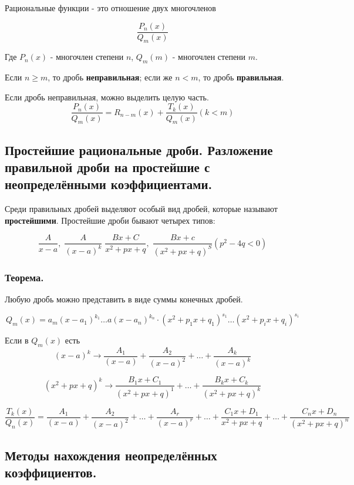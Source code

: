 \documentclass[a4paper,12pt]{article}
\theoremstyle{plain} %
\theoremstyle{definition} %
\theoremstyle{remark} %
\begin{document}
Рациональные функции - это отношение двух многочленов

\[
	\frac{P_n(x)}{Q_m(x)}
\]

Где $P_n(x)$ - многочлен степени $n$, $Q_m(m)$ - многочлен степени $m$.

Если $n \ge m$, то дробь \textbf{неправильная}; если же $n < m$, то дробь \textbf{правильная}.

\begin{center}
	Если дробь неправильная, можно выделить целую часть.
	\[
		\frac{P_n(x)}{Q_m(x)} = R_{n-m}(x) + \frac{T_k(x)}{Q_m(x)} (k < m)
	\]
\end{center}




\newpage
\subsection*{Простейшие рациональные дроби. Разложение правильной дроби на простейшие с неопределёнными коэффициентами.}

Среди правильных дробей выделяют особый вид дробей, которые называют \textbf{простейшими}. Простейшие дроби бывают четырех типов:

\[ \frac{A}{x - a}, \; \frac{A}{(x - a)^k} \; \frac{Bx + C}{x^2 + px + q}, \; \frac{Bx+c}{(x^2 + px + q)^S} (p^2 - 4q < 0) \]

\subsubsection*{Теорема.}
Любую дробь можно представить в виде суммы конечных дробей.

\[
	Q_m(x) = a_m(x - a_1)^{k_1} \dots a(x - a_n)^{k_n} \cdot (x^2 + p_1x + q_1)^{s_1} \dots (x^2 + p_ix + q_i)^{s_i}
\]

Если в $Q_m(x)$ есть
\[(x-a)^k \rightarrow \frac{A_1}{(x - a)} + \frac{A_2}{(x - a)^2} + \dots + \frac{A_k}{(x - a)^k} \]

\[ (x^2 + px + q)^k \rightarrow \frac{B_1 x+C_1}{(x^2 + px + q)^1} + \dots + \frac{B_k x+C_k}{(x^2 + px + q)^k}  \]


\[
	\frac{T_k(x)}{Q_n(x)} = \frac{A_1}{(x - a)} + \frac{A_2}{(x - a)^2} + \dots + \frac{A_r}{(x - a)^r} + \dots + \frac{C_1 x + D_1}{x^2 + px + q} + \dots + \frac{C_n x + D_n}{(x^2 + px + q)^n}
\]


\newpage
\subsection*{Методы нахождения неопределённых коэффициентов.} \label{methods}
\end{document}
